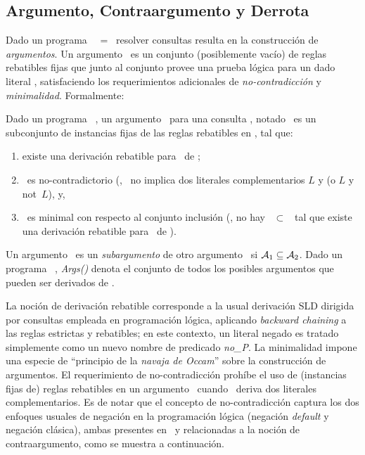 \subsection{Argumento, Contraargumento y Derrota}

Dado un programa \DLP\ \PP\ = \SD\, resolver consultas resulta en la construcción de \textit{argumentos}.
Un argumento \ArgA\ es un conjunto (posiblemente vacío) de reglas rebatibles fijas que junto al conjunto \SSet
provee una prueba lógica para un dado literal \ArgQ, satisfaciendo los requerimientos adicionales de 
\textit{no-contradicción} y \textit{minimalidad}. Formalmente:

\begin{definicion}[Argumento]
	Dado un programa \DLP\ \PP, un argumento \ArgA\ para una consulta \ArgQ, notado \AQ\, es un subconjunto de 
	instancias fijas de las reglas rebatibles en \PP, tal que:
	
	\begin{enumerate}[(1)]
		\item existe una derivación rebatible para \ArgQ\ de \SyA;
		\item \SyA\ es no-contradictorio (\ie, \SyA\ no implica dos literales complementarios $L$ y 
		(o $L$ y \textsf{not}\ $L$), y,		
		\item \ArgA\ es minimal con respecto al conjunto inclusión (\ie, no hay \Ap\ $\subset$ \ArgA\ tal que
		existe una derivación rebatible para \ArgQ\ de \SyAp).
	\end{enumerate}
	
\end{definicion}

Un argumento \AaQa\ es un \textit{subargumento} de otro argumento \AbQb\ si $\mbox{${\mathcal A_1}$} \subseteq \mbox{${\mathcal A_2}$}$.
Dado un programa \DLP\ \PP, \textit{Args(\PP)} denota el conjunto de todos los posibles argumentos que 
pueden ser derivados de \PP.

La noción de derivación rebatible corresponde a la usual derivación SLD dirigida por consultas
empleada en programación lógica, aplicando \textit{backward chaining} a las reglas estrictas y rebatibles;
en este contexto, un literal negado  es tratado simplemente como un nuevo nombre de predicado \textit{no\_P}. La minimalidad impone una especie de ``principio de la \textit{navaja de Occam}'' sobre la construcción 
de argumentos. El requerimiento de no-contradicción prohíbe el uso de (instancias fijas de) reglas rebatibles
en un argumento \ArgA\ cuando \SyA\ deriva dos literales complementarios. Es de notar que el concepto de no-contradicción captura los dos enfoques usuales de negación en la programación lógica (negación \textit{default}
y negación clásica), ambas presentes en \DLP\ y relacionadas a la noción de contraargumento, como se muestra a continuación.

